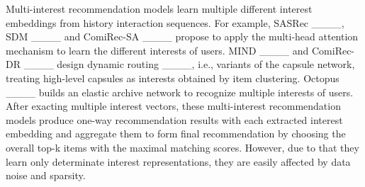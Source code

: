  Multi-interest recommendation models learn multiple different interest embeddings from history interaction sequences. For example, SASRec ____, SDM ____ and ComiRec-SA ____ propose to apply the multi-head attention mechanism to learn the different interests of users. MIND ____ and ComiRec-DR ____ design dynamic routing ____, i.e., variants of the capsule network, treating high-level capsules as interests obtained by item clustering. Octopus ____ builds an elastic archive network to recognize multiple interests of users. After exacting multiple interest vectors, these multi-interest recommendation models produce one-way recommendation results with each extracted interest embedding and aggregate them to form final recommendation by choosing the overall top-k items with the maximal matching scores. However, due to that they learn only determinate interest representations, they are easily affected by data noise and sparsity.